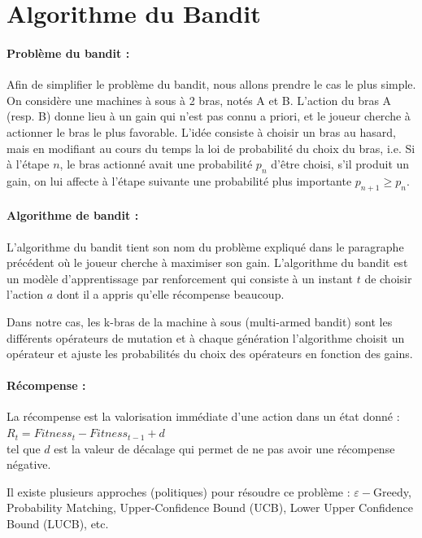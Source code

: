 \documentclass[12pt]{article}
\begin{document}
\section{Algorithme du Bandit}
\paragraph{Problème du bandit : } Afin de simplifier le problème du bandit, nous allons prendre le cas le plus simple. On considère une machines à sous à 2 bras, notés A et B. L’action du bras A (resp. B) donne lieu à un gain qui n'est pas connu a priori, et le joueur cherche à actionner le bras le plus favorable. L'idée consiste à choisir un bras au hasard, mais en modifiant au cours du temps la loi de probabilité du choix du bras, i.e. Si à l’étape $ n $, le bras actionné avait une probabilité $ p_n $ d’être choisi, s’il produit un gain, on lui affecte à l’étape suivante une probabilité plus importante $ p_{n+1} \ge p_n $.

\paragraph{Algorithme de bandit : } L'algorithme du bandit tient son nom du problème expliqué dans le paragraphe précédent où le joueur cherche à maximiser son gain. L'algorithme du bandit est un modèle d'apprentissage par renforcement qui consiste à un instant $ t $ de choisir l'action $ a $ dont il a appris qu'elle récompense beaucoup.\\

\par Dans notre cas, les k-bras de la machine à sous (multi-armed bandit) sont les différents opérateurs de mutation et à chaque génération l'algorithme choisit un opérateur et ajuste les probabilités du choix des opérateurs en fonction des gains.

\paragraph{Récompense : } La récompense est la valorisation immédiate d’une action dans un état donné : $ R_t = Fitness_t - Fitness_{t-1} + d $ \\tel que $ d $ est la valeur de décalage qui permet de ne pas avoir une récompense négative.\\

\par Il existe plusieurs approches (politiques) pour résoudre ce problème : $ \varepsilon- $Greedy, Probability Matching, Upper-Confidence Bound (UCB), Lower Upper Confidence Bound (LUCB), etc.\\
\end{document}
